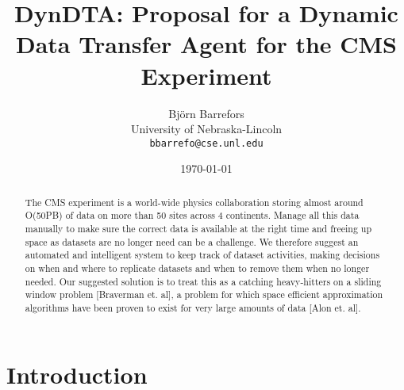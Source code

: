 \documentclass[11pt,a4page]{article}
\title{\textbf{\fontfamily{\sfdefault}\selectfont DynDTA: Proposal for a Dynamic Data Transfer Agent for the CMS Experiment}}
\author{Bj\"{o}rn Barrefors\\
  University of Nebraska-Lincoln\\
  \texttt{bbarrefo@cse.unl.edu}}
\date{\today}
\begin{document}
\maketitle

\begin{abstract}

	The CMS experiment is a world-wide physics collaboration storing almost around O(50PB) of data on more than 50 sites across 4 continents. Manage all this data manually to make sure the correct data is available at the right time and freeing up space as datasets are no longer need can be a challenge. We therefore suggest an automated and intelligent system to keep track of dataset activities, making decisions on when and where to replicate datasets and when to remove them when no longer needed. Our suggested solution is to treat this as a catching heavy-hitters on a sliding window problem [Braverman et. al], a problem for which space efficient approximation algorithms have been proven to exist for very large amounts of data [Alon et. al].

\end{abstract}


\section*{Introduction}
\end{document}
